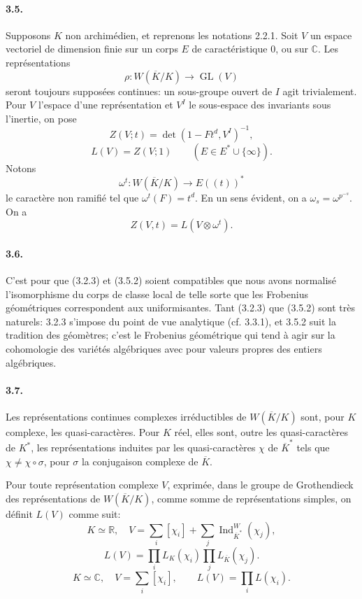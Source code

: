 \documentclass[10pt]{article}
\newcommand{\C}{\mathbb C}
\newcommand{\GL}{\operatorname{GL}}
\newcommand{\Ind}{\operatorname{Ind}}
\providecommand{\R}{\mathbb R}
\providecommand{\GL}{\operatorname{GL}}
\providecommand{\GL}{\operatorname{GL}}
\providecommand{\Ind}{\operatorname{Ind}}
\begin{document}
\paragraph{3.5.} Supposons \(K\) non archimédien, et reprenons les notations 2.2.1. Soit \(V\) un espace vectoriel de dimension finie sur un corps \(E\) de caractéristique \(0\), ou sur \(\C\). Les représentations
\[
\rho:W(\overline K/K)\longrightarrow\GL(V)
\]
seront toujours supposées continues: un sous-groupe ouvert de \(I\) agit trivialement. Pour \(V\) l'espace d'une représentation et \(V^I\) le sous-espace des invariants sous l'inertie, on pose
\[
\tag{3.5.1}
Z(V;t)=\det(1-Ft^d,V^I)^{-1},
\]
\[
\tag{3.5.2}
L(V)=Z(V;1)\qquad(E\in E^*\cup\{\infty\}).
\]
Notons
\[
\omega^t:W(\overline K/K)\longrightarrow E((t))^*
\]
le caractère non ramifié tel que \(\omega^t(F)=t^d\). En un sens évident, on a \(\omega_s=\omega^{p^{-s}}\). On a
\[
\tag{3.5.3}
Z(V,t)=L(V\otimes\omega^t).
\]

\paragraph{3.6.} C'est pour que (3.2.3) et (3.5.2) soient compatibles que nous avons normalisé l'isomorphisme du corps de classe local de telle sorte que les Frobenius géométriques correspondent aux uniformisantes. Tant (3.2.3) que (3.5.2) sont très naturels: 3.2.3 s'impose du point de vue analytique (cf. 3.3.1), et 3.5.2 suit la tradition des géomètres; c'est le Frobenius géométrique qui tend à agir sur la cohomologie des variétés algébriques avec pour valeurs propres des entiers algébriques.

\paragraph{3.7.} Les représentations continues complexes irréductibles de \(W(\overline K/K)\) sont, pour \(K\) complexe, les quasi-caractères. Pour \(K\) réel, elles sont, outre les quasi-caractères de \(K^*\), les représentations induites par les quasi-caractères \(\chi\) de \(\overline K^*\) tels que \(\chi\ne\chi\circ\sigma\), pour \(\sigma\) la conjugaison complexe de \(\overline K\).

Pour toute représentation complexe \(V\), exprimée, dans le groupe de Grothendieck des représentations de \(W(\overline K/K)\), comme somme de représentations simples, on définit \(L(V)\) comme suit:
\[
\tag{3.7.1}
K\simeq\R,\quad
V=\sum_i[\chi_i]+\sum_j\Ind_{\overline K^*}^{W}(\chi_j),
\]
\[
L(V)=\prod_i L_K(\chi_i)\prod_j L_{\overline K}(\chi_j).
\]
\[
\tag{3.7.2}
K\simeq\C,\quad V=\sum_i[\chi_i],
\qquad
L(V)=\prod_iL(\chi_i).
\]
\end{document}
